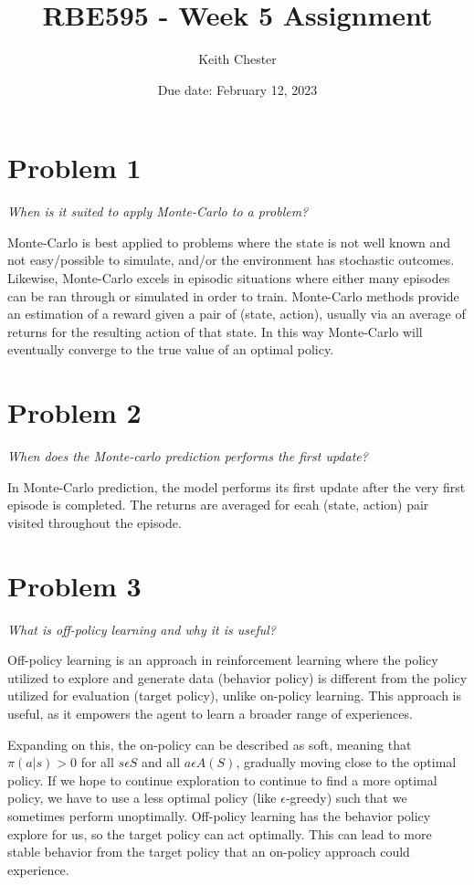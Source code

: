 \documentclass{article}
\title{RBE595 - Week 5 Assignment}
\author{Keith Chester}
\date{Due date: February 12, 2023}
\begin{document}
\maketitle

\section*{Problem 1}
\textit{When is it suited to apply Monte-Carlo to a problem?}

Monte-Carlo is best applied to problems where the state is not well known and not easy/possible to simulate, and/or the environment has stochastic outcomes. Likewise, Monte-Carlo excels in episodic situations where either many episodes can be ran through or simulated in order to train. Monte-Carlo methods provide an estimation of a reward given a pair of (state, action), usually via an average of returns for the resulting action of that state. In this way Monte-Carlo will eventually converge to the true value of an optimal policy.


\section*{Problem 2}
\textit{When does the Monte-carlo prediction performs the first update? }

In Monte-Carlo prediction, the model performs its first update after the very first episode is completed. The returns are averaged for ecah (state, action) pair visited throughout the episode.

\section*{Problem 3}
\textit{What is off-policy learning and why it is useful? }


Off-policy learning is an approach in reinforcement learning where the policy utilized to explore and generate data (behavior policy) is different from the policy utilized for evaluation (target policy), unlike on-policy learning. This approach is useful, as it empowers the agent to learn a broader range of experiences.

Expanding on this, the on-policy can be described as soft, meaning that $\pi(a|s)>0$ for all $s\epsilon S$ and all $a \epsilon A(S)$, gradually moving close to the optimal policy. If we hope to continue exploration to continue to find a more optimal policy, we have to use a less optimal policy (like $\epsilon$-greedy) such that we sometimes perform unoptimally. Off-policy learning has the behavior policy explore for us, so the target policy can act optimally. This can lead to more stable behavior from the target policy that an on-policy approach could experience.
\end{document}
